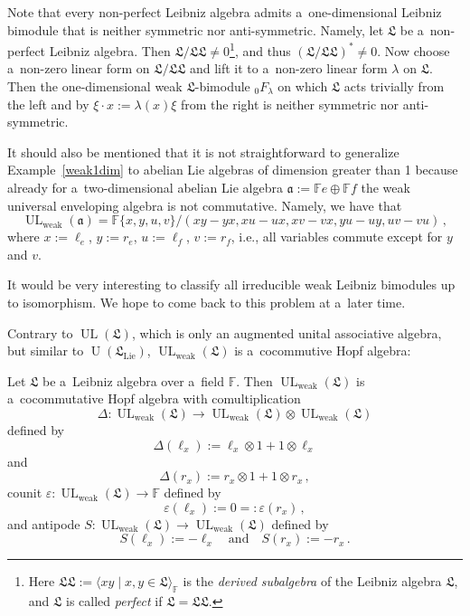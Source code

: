\documentclass{jonasart}
\DeclareMathOperator{\lie}{Lie}
\DeclareMathOperator{\U}{U}
\DeclareMathOperator{\UL}{UL}
\DeclareMathOperator{\weak}{weak}
\newcommand{\aaf}{\mathfrak{a}}
\newcommand{\fbb}{\mathbb{F}}
\newcommand{\lf}{\mathfrak{L}}
\begin{document}
	\begin{remark}\label{nonperfect}
		{Note that every non-perfect Leibniz algebra admits a~one-dimen\-sional
		Leibniz bimodule that is neither symmetric nor anti-symmetric. Namely, let $\lf$
		be a~non-perfect Leibniz algebra. Then $\lf/\lf\lf\ne 0$\footnote{Here $\lf\lf:=
		\langle xy\mid x,y\in\lf\rangle_\fbb$ is the \emph{derived subalgebra\/}
		of the Leibniz algebra $\lf$, and $\lf$ is called \emph{perfect\/} if $\lf=\lf\lf$.},
		and thus $(\lf/\lf\lf)^*\ne 0$. Now choose a~non-zero linear form on $\lf/\lf\lf$
		and lift it to a~non-zero linear form $\lambda$ on $\lf$. Then the one-dimensional weak $\lf$-bimodule $_0 F_\lambda$ on which $\lf$ acts trivially from the left and by $\xi\cdot x:=\lambda(x)\xi$ from the right is neither symmetric nor anti-symmetric.}

		{It should also be mentioned that it is not straightforward to generalize
		Example~\ref{weak1dim} to abelian Lie algebras of dimension greater than 1
		because already for a~two-dimensional abelian Lie algebra $\aaf:=\fbb e\oplus
		\fbb f$ the weak universal enveloping algebra is not commutative. Namely, we have that}
		\[
			\UL_{\weak}(\aaf)=\fbb\{x,y,u,v\}/(xy-yx,xu-ux,xv-vx,yu-uy,uv-vu)\,,
		\]
		{where $x:=\ell_e$, $y:=r_e$, $u:=\ell_f$,   $v:=r_f$, i.e., all variables commute except for $y$ and $v$.}
	\end{remark}
	It would be very interesting to classify all irreducible weak Leibniz bimodules up to isomorphism. We hope to come back to this problem at a~later time.

	Contrary to $\UL(\lf)$, which is only an augmented unital associative algebra, but similar to $\U(\lf_{\lie})$, $\UL_{\weak}(\lf)$ is a~cocommutive
	Hopf algebra:
	\begin{theorem}\label{hopf}
		Let $\lf$ be a~Leibniz algebra over a~field $\fbb$. Then $\UL_{\weak}(\lf)$
		is a~cocommutative Hopf algebra with comultiplication
		\[
			\Delta:\UL_{\weak}(\lf)\to\UL_{\weak}(\lf)\otimes\UL_{\weak}(\lf)
		\]
		defined by
		\[
			\Delta(\ell_x ):=\ell_x\otimes 1+1\otimes\ell_x
		\]
		and
		\[
			\Delta(r_x ):=r_x\otimes 1+1\otimes r_x\,,
		\]
		counit
		$\varepsilon:\UL_{\weak}(\lf)\to\fbb$ defined by
		\[
			\varepsilon(\ell_x ):=0=:\varepsilon(r_x )\,,
		\]
		and antipode $S:\UL_{\weak}(\lf)\to\UL_{\weak}(\lf)$
		defined by
		\[
			S(\ell_x ):=-\ell_x\quad\mbox{and}\quad S(r_x ):=-r_x\,.
		\]
	\end{theorem}
\end{document}

